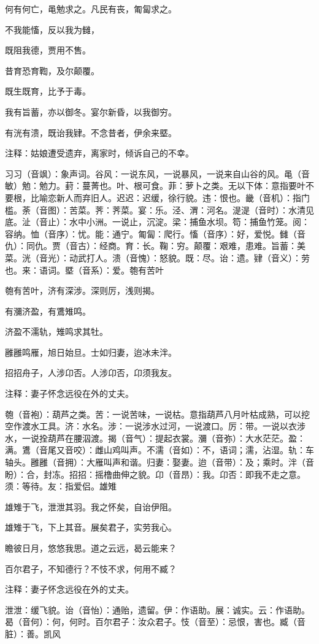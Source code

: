 \documentclass[12pt,UTF8]{ctexbook}
\begin{document}
何有何亡，黾勉求之。凡民有丧，匍匐求之。

不我能慉，反以我为雠，

既阻我德，贾用不售。

昔育恐育鞫，及尔颠覆。

既生既育，比予于毒。

我有旨蓄，亦以御冬。宴尔新昏，以我御穷。

有洸有溃，既诒我肄。不念昔者，伊余来塈。

注释：姑娘遭受遗弃，离家时，倾诉自己的不幸。

习习（音飒）：象声词。谷风：一说东风，一说暴风，一说来自山谷的风。黾（音敏）勉：勉力。葑：蔓菁也。叶、根可食。菲：萝卜之类。无以下体：意指要叶不要根，比喻恋新人而弃旧人。迟迟：迟缓，徐行貌。违：恨也。畿（音机）：指门槛。荼（音图）：苦菜。荠：荠菜。宴：乐。泾、渭：河名。湜湜（音时）：水清见底。沚（音止）：水中小洲。一说止，沉淀。梁：捕鱼水坝。笱：捕鱼竹笼。阅：容纳。恤（音序）：忧。能：通宁。匍匐：爬行。慉（音序）：好，爱悦。雠（音仇）：同仇。贾（音古）：经商。育：长。鞠：穷。颠覆：艰难，患难。旨蓄：美菜。洸（音光）：动武打人。溃（音愧）：怒貌。既：尽。诒：遗。肄（音义）：劳也。来：语词。塈（音系）：爱。匏有苦叶

匏有苦叶，济有深涉。深则厉，浅则揭。

有瀰济盈，有鷕雉鸣。

济盈不濡轨，雉鸣求其牡。

雝雝鸣雁，旭日始旦。士如归妻，迨冰未泮。

招招舟子，人涉卬否。人涉卬否，卬须我友。

注释：妻子怀念远役在外的丈夫。

匏（音袍）：葫芦之类。苦：一说苦味，一说枯。意指葫芦八月叶枯成熟，可以挖空作渡水工具。济：水名。涉：一说涉水过河，一说渡口。厉：带。一说以衣涉水，一说拴葫芦在腰泅渡。揭（音气）：提起衣裳。瀰（音弥）：大水茫茫。盈：满。鷕（音尾又音咬）：雌山鸡叫声。不濡（音如）：不，语词；濡，沾湿。轨：车轴头。雝雝（音拥）：大雁叫声和谐。归妻：娶妻。迨（音带）：及；乘时。泮（音盼）：合，封冻。招招：摇橹曲伸之貌。卬（音昂）：我。卬否：即我不走之意。须：等待。友：指爱侣。雄雉

雄雉于飞，泄泄其羽。我之怀矣，自诒伊阻。

雄雉于飞，下上其音。展矣君子，实劳我心。

瞻彼日月，悠悠我思。道之云远，曷云能来？

百尔君子，不知德行？不忮不求，何用不臧？

注释：妻子怀念远役在外的丈夫。

泄泄：缓飞貌。诒（音怡）：通贻，遗留。伊：作语助。展：诚实。云：作语助。曷（音何）：何，何时。百尔君子：汝众君子。忮（音至）：忌恨，害也。臧（音脏）：善。凯风
\end{document}
